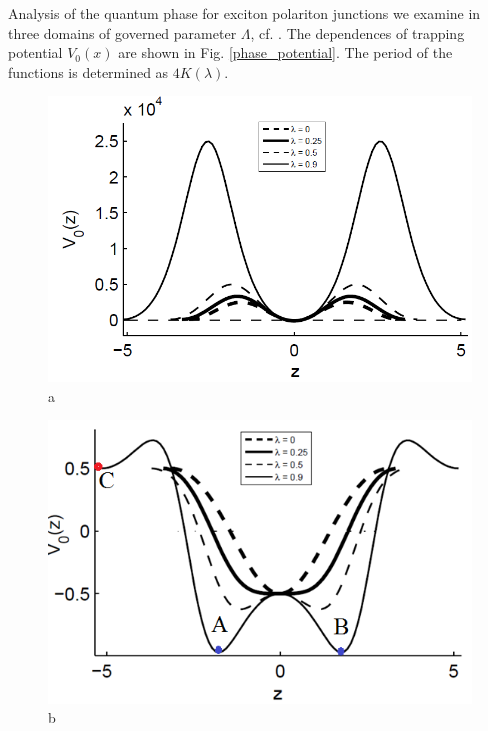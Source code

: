 \documentclass[aps, pre, preprint, groupedaddress, superscriptaddress, showkeys, showpacs] {revtex4-1}
\begin{document}
Analysis of the quantum phase for exciton polariton junctions we examine in three domains of  governed parameter $\Lambda$, cf. \cite{Anglin}.
The dependences of trapping potential $V_0(x)$ are shown in Fig. \ref{phase_potential}.
The period of the functions is determined as $4K(\lambda)$.
%
\begin{figure}[ht]
\begin{minipage}[htbp]{0.32\linewidth}	{\includegraphics[width=1\linewidth]{pic/potential_L=100.png} \\ a}
\end{minipage}
\begin{minipage}[htbp]{0.32\linewidth}	{\includegraphics[width=1\linewidth]{pic/potential_L=05.png} \\ b}
\end{minipage}

\end{figure}
\end{document}
